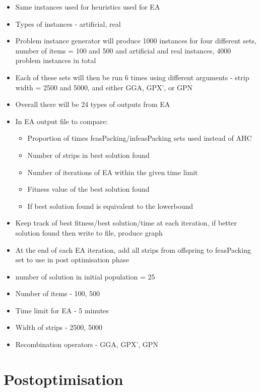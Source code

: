 \documentclass{elsarticle}
\begin{document}
{\color{OrangeRed}
\begin{itemize}
	\item Same instances used for heuristics used for EA
	\item Types of instances - artificial, real
	\item Problem instance generator will produce 1000 instances for four different sets, number of items = 100 and 500 and artificial and real instances, 4000 problem instances in total
	\item Each of these sets will then be run 6 times using different arguments - strip width = 2500 and 5000, and either GGA, GPX', or GPN
	\item Overall there will be 24 types of outputs from EA
	\item In EA output file to compare:
	\begin{itemize}
		\item Proportion of times feasPacking/infeasPacking sets used instead of AHC
		\item Number of strips in best solution found
		\item Number of iterations of EA within the given time limit
		\item Fitness value of the best solution found
		\item If best solution found is equivalent to the lowerbound
	\end{itemize}
	\item Keep track of best fitness/best solution/time at each iteration, if better solution found then write to file, produce graph
	\item At the end of each EA iteration, add all strips from offspring to feasPacking set to use in post optimisation phase
	\item number of solution in initial population = 25
	\item Number of items - 100, 500
	\item Time limit for EA - 5 minutes
	\item Width of strips - 2500, 5000
	\item Recombination operators - GGA, GPX', GPN
\end{itemize}
}


\section{Postoptimisation}
\label{sec:postopt}
\end{document}
